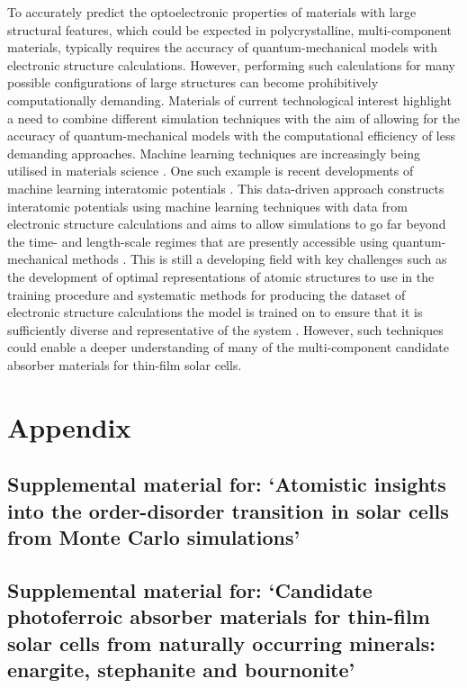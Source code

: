 \documentclass[11pt, twoside]{report}
\begin{document}
To accurately predict the optoelectronic properties of materials with large structural features, which could be expected in polycrystalline, multi-component materials, typically requires the accuracy of quantum-mechanical models with electronic structure calculations. However, performing such calculations for many possible configurations of large structures can become prohibitively computationally demanding.
Materials of current technological interest highlight a need to combine different simulation techniques with the aim of allowing for the accuracy of quantum-mechanical models with the computational efficiency of less demanding approaches. Machine learning techniques are increasingly being utilised in materials science \cite{Mueller2016, Keith_ML}. One such example is recent developments of machine learning interatomic potentials \cite{MLIP_chap, Behler2015}. This data-driven approach constructs interatomic potentials using machine learning techniques with data from electronic structure calculations and aims to allow simulations to go far beyond the time- and length-scale regimes that are presently accessible using quantum-mechanical methods \cite{MLIP}.
This is still a developing field with key challenges such as the development of optimal representations of atomic structures to use in the training procedure and systematic methods for producing the dataset of electronic structure calculations the model is trained on to ensure that it is sufficiently diverse and representative of the system \cite{MLIP_chap}. However, such techniques could enable a deeper understanding of many of the multi-component candidate absorber materials for thin-film solar cells.





\appendix
\chapter{Appendix}

\section{Supplemental material for: `Atomistic insights into the order-disorder transition in {\CZTS} solar cells from Monte Carlo simulations'}\label{eris1_appendix}


\section{Supplemental material for: `Candidate photoferroic absorber materials for thin-film solar cells from naturally occurring minerals: enargite, stephanite and bournonite'}\label{App_sulfosalts1}

\end{document}

